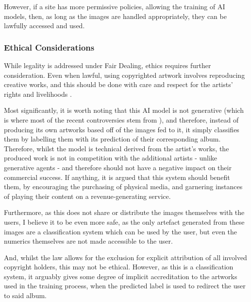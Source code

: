                   However, if a site has more permissive policies, allowing the training of AI models, then, as long as the images are handled appropriately, they can be lawfully accessed and used.
    
              \subsubsection{Ethical Considerations}
    
                  While legality is addressed under Fair Dealing, ethics requires further consideration. Even when lawful, using copyrighted artwork involves reproducing creative works, and this should be done with care and respect for the artists’ rights and livelihoods \cite{heikkila2022ai_art}.
    
                  Most significantly, it is worth noting that this AI model is not generative (which is where most of the recent controversies stem from \cite{apnews2025mccartney_ai_warning}), and therefore, instead of producing its own artworks based off of the images fed to it, it simply classifies them by labelling them with its prediction of their corresponding album. Therefore, whilst the model is technical derived from the artist's works, the produced work is not in competition with the additional artists - unlike generative agents \cite{times2025photographer_ai_copy} - and therefore should not have a negative impact on their commercial success. If anything, it is argued that this system should benefit them, by encouraging the purchasing of physical media, and garnering instances of playing their content on a revenue-generating service.
    
                  Furthermore, as this does not share or distribute the images themselves with the users, I believe it to be even more safe, as the only artefact generated from these images are a classification system which can be used by the user, but even the numerics themselves are not made accessible to the user.
    
                  And, whilst the law allows for the exclusion for explicit attribution of all involved copyright holders, this may not be ethical. However, as this is a classification system, it arguably gives some degree of implicit accreditation to the artworks used in the training process, when the predicted label is used to redirect the user to said album.
    
